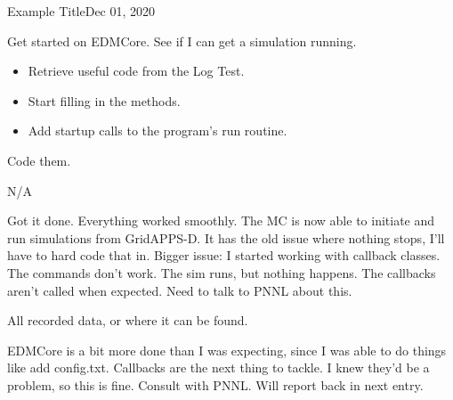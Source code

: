 \begin{entry}{Example Title}{Dec 01, 2020}
    \objective 
    
    Get started on EDMCore. See if I can get a simulation running.

    \outline

    \begin{itemize}
        \item Retrieve useful code from the Log Test.
        \item Start filling in the methods.
        \item Add startup calls to the program's run routine.

    \end{itemize}

    \procedures
    
    Code them.

    \parameters
    
    N/A

    \observations
    
    Got it done. Everything worked smoothly. The MC is now able to initiate and run simulations from GridAPPS-D.
    It has the old issue where nothing stops, I'll have to hard code that in.
    Bigger issue: I started working with callback classes. The commands don't work. The sim runs, but nothing happens.
    The callbacks aren't called when expected. Need to talk to PNNL about this.

    \data
    
    All recorded data, or where it can be found.
    
    \results
    
    EDMCore is a bit more done than I was expecting, since I was able to do things like add config.txt.
    Callbacks are the next thing to tackle. I knew they'd be a problem, so this is fine. Consult with PNNL. Will report
    back in next entry.

\end{entry}


